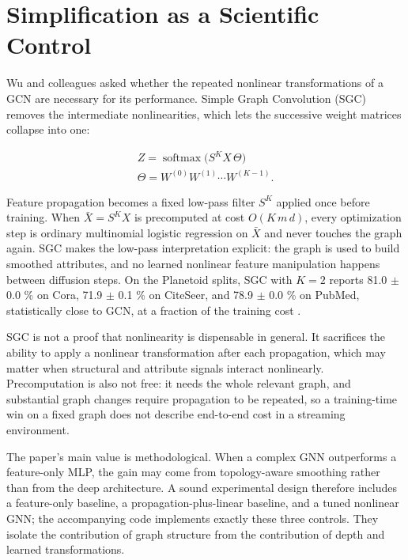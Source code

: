 \documentclass[conference]{IEEEtran}
\begin{document}
\section{Simplification as a Scientific Control}

Wu and colleagues \cite{b5} asked whether the repeated nonlinear transformations of a GCN are necessary for its performance. Simple Graph Convolution (SGC) removes the intermediate nonlinearities, which lets the successive weight matrices collapse into one:

\[\begin{gathered}Z = \operatorname{softmax}\big(S^{K} X\,\Theta\big) \\ \Theta = W^{(0)}W^{(1)}\cdots W^{(K-1)}.\end{gathered}\tag{10}\]

Feature propagation becomes a fixed low-pass filter \(S^K\) applied once before training. When \(\bar X = S^K X\) is precomputed at cost \(O(K\,m\,d)\), every optimization step is ordinary multinomial logistic regression on \(\bar X\) and never touches the graph again. SGC makes the low-pass interpretation explicit: the graph is used to build smoothed attributes, and no learned nonlinear feature manipulation happens between diffusion steps. On the Planetoid splits, SGC with \(K=2\) reports 81.0 \ensuremath{\pm} 0.0 \% on Cora, 71.9 \ensuremath{\pm} 0.1 \% on CiteSeer, and 78.9 \ensuremath{\pm} 0.0 \% on PubMed, statistically close to GCN, at a fraction of the training cost \cite{b5}.

SGC is not a proof that nonlinearity is dispensable in general. It sacrifices the ability to apply a nonlinear transformation after each propagation, which may matter when structural and attribute signals interact nonlinearly. Precomputation is also not free: it needs the whole relevant graph, and substantial graph changes require propagation to be repeated, so a training-time win on a fixed graph does not describe end-to-end cost in a streaming environment.

The paper's main value is methodological. When a complex GNN outperforms a feature-only MLP, the gain may come from topology-aware smoothing rather than from the deep architecture. A sound experimental design therefore includes a feature-only baseline, a propagation-plus-linear baseline, and a tuned nonlinear GNN; the accompanying code implements exactly these three controls. They isolate the contribution of graph structure from the contribution of depth and learned transformations.
\end{document}
